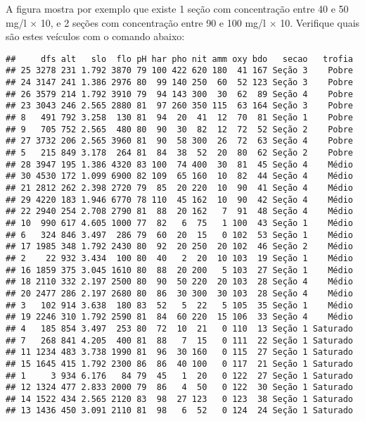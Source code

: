 \documentclass[
]{book}
\newenvironment{Shaded}{\begin{snugshade}}{\end{snugshade}}
\newcommand{\KeywordTok}[1]{\textcolor[rgb]{0.13,0.29,0.53}{\textbf{#1}}}
\newcommand{\NormalTok}[1]{#1}
\newcommand{\OperatorTok}[1]{\textcolor[rgb]{0.81,0.36,0.00}{\textbf{#1}}}
\begin{document}
A figura mostra por exemplo que existe 1 seção com concentração entre 40 e 50 mg/l \(\times\) 10, e 2 seções com concentração entre 90 e 100 mg/l \(\times\) 10. Verifique quais são estes veículos com o comando abaixo:

\begin{Shaded}
\end{Shaded}

\begin{verbatim}
##     dfs alt   slo  flo pH har pho nit amm oxy bdo   secao   trofia
## 25 3278 231 1.792 3870 79 100 422 620 180  41 167 Seção 3    Pobre
## 24 3147 241 1.386 2976 80  99 140 250  60  52 123 Seção 3    Pobre
## 26 3579 214 1.792 3910 79  94 143 300  30  62  89 Seção 4    Pobre
## 23 3043 246 2.565 2880 81  97 260 350 115  63 164 Seção 3    Pobre
## 8   491 792 3.258  130 81  94  20  41  12  70  81 Seção 1    Pobre
## 9   705 752 2.565  480 80  90  30  82  12  72  52 Seção 2    Pobre
## 27 3732 206 2.565 3960 81  90  58 300  26  72  63 Seção 4    Pobre
## 5   215 849 3.178  264 81  84  38  52  20  80  62 Seção 2    Pobre
## 28 3947 195 1.386 4320 83 100  74 400  30  81  45 Seção 4    Médio
## 30 4530 172 1.099 6900 82 109  65 160  10  82  44 Seção 4    Médio
## 21 2812 262 2.398 2720 79  85  20 220  10  90  41 Seção 4    Médio
## 29 4220 183 1.946 6770 78 110  45 162  10  90  42 Seção 4    Médio
## 22 2940 254 2.708 2790 81  88  20 162   7  91  48 Seção 4    Médio
## 10  990 617 4.605 1000 77  82   6  75   1 100  43 Seção 1    Médio
## 6   324 846 3.497  286 79  60  20  15   0 102  53 Seção 1    Médio
## 17 1985 348 1.792 2430 80  92  20 250  20 102  46 Seção 2    Médio
## 2    22 932 3.434  100 80  40   2  20  10 103  19 Seção 1    Médio
## 16 1859 375 3.045 1610 80  88  20 200   5 103  27 Seção 1    Médio
## 18 2110 332 2.197 2500 80  90  50 220  20 103  28 Seção 4    Médio
## 20 2477 286 2.197 2680 80  86  30 300  30 103  28 Seção 4    Médio
## 3   102 914 3.638  180 83  52   5  22   5 105  35 Seção 1    Médio
## 19 2246 310 1.792 2590 81  84  60 220  15 106  33 Seção 4    Médio
## 4   185 854 3.497  253 80  72  10  21   0 110  13 Seção 1 Saturado
## 7   268 841 4.205  400 81  88   7  15   0 111  22 Seção 1 Saturado
## 11 1234 483 3.738 1990 81  96  30 160   0 115  27 Seção 1 Saturado
## 15 1645 415 1.792 2300 86  86  40 100   0 117  21 Seção 1 Saturado
## 1     3 934 6.176   84 79  45   1  20   0 122  27 Seção 1 Saturado
## 12 1324 477 2.833 2000 79  86   4  50   0 122  30 Seção 1 Saturado
## 14 1522 434 2.565 2120 83  98  27 123   0 123  38 Seção 1 Saturado
## 13 1436 450 3.091 2110 81  98   6  52   0 124  24 Seção 1 Saturado
\end{verbatim}
\end{document}
